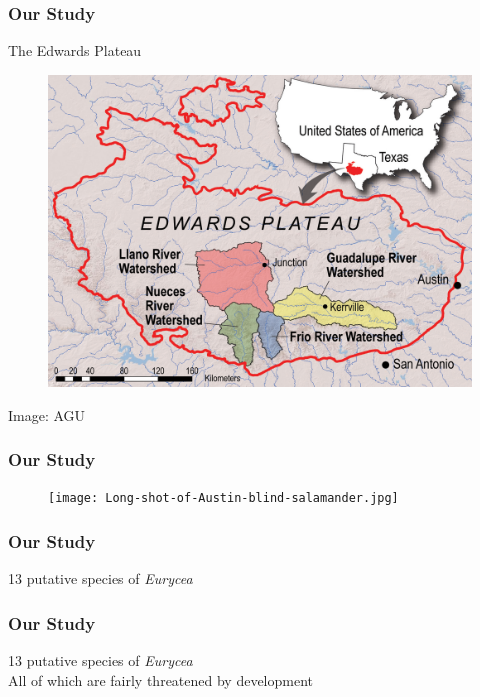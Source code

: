 \documentclass{beamer}
\begin{document}
\begin{frame}
\frametitle{Our Study}
\begin{block}{The Edwards Plateau}
\begin{figure}
    \includegraphics[scale=0.15]{pr_2010-06_map_hi-res.jpg}
    \end{figure}

    \end{block}
\centerline{Image: AGU}

\end{frame}

\begin{frame}
\frametitle{Our Study}
\begin{figure}
    \texttt{[image: Long-shot-of-Austin-blind-salamander.jpg]}
    \end{figure}
\end{frame}

\begin{frame}
\frametitle{Our Study}
13 putative species of \textit{Eurycea}
\end{frame}

\begin{frame}
\frametitle{Our Study}
13 putative species of \textit{Eurycea} \\
All of which are fairly threatened by development
\end{frame}
\end{document}

